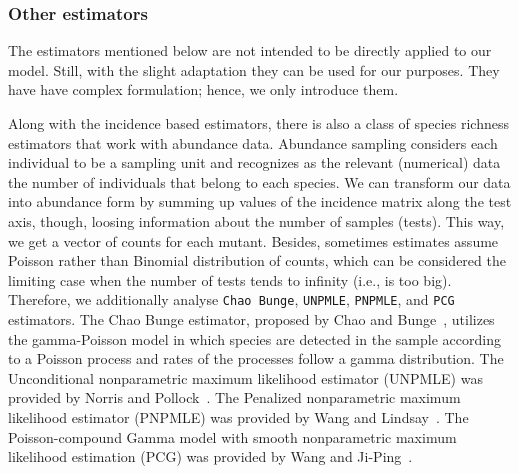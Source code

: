 \documentclass[sigconf,review,anonymous]{acmart}
\newcommand{\ChaoBunge}{Chao Bunge\xspace}
\newcounter{todocounter}
\newcommand{\todo}[1]{\marginpar{$|$}\textcolor{red}{\stepcounter{todocounter}\footnote[\thetodocounter]{\textcolor{red}{\textbf{TODO }}\textit{#1}}}}
\def\<#1>{\texttt{#1}}
\renewcommand{\todo}[1]{}
\begin{document}

\subsubsection{Other estimators}
The estimators mentioned below are not intended to be directly applied to our model.
Still, with the slight adaptation they can be used for our purposes.
They have have complex formulation; hence, we only introduce them.

Along with the incidence based estimators, there is also a class of species richness estimators that work with abundance data.
Abundance sampling considers each individual to be a sampling unit
and recognizes as the relevant (numerical) data the number of individuals
that belong to each species.
%
We can transform our data into abundance form by summing up values of the incidence matrix along the test axis,
though, loosing information about the number of samples (tests). This way, we get a vector of counts for each mutant.
Besides, sometimes estimates assume Poisson rather than Binomial distribution of counts, which can be considered the limiting case when the number of tests tends to infinity (i.e., is too big).
%
Therefore, we additionally analyse \<\ChaoBunge>, \<UNPMLE>, \<PNPMLE>, and \<PCG> estimators.
The \ChaoBunge estimator, proposed by Chao and Bunge~\cite{chao2002estimating},
utilizes the gamma-Poisson model in which species are detected in the sample
according to a Poisson process and rates of the processes follow a gamma distribution.
%
The Unconditional nonparametric maximum likelihood estimator (UNPMLE)
was provided by Norris and Pollock~\cite{norris1998non}.
%
The Penalized nonparametric maximum likelihood estimator (PNPMLE)
was provided by Wang and Lindsay~\cite{wang2005penalized}.
%
The Poisson-compound Gamma model with smooth nonparametric maximum likelihood estimation (PCG)
was provided by Wang and Ji-Ping~\cite{wang2010estimating}.
\end{document}
